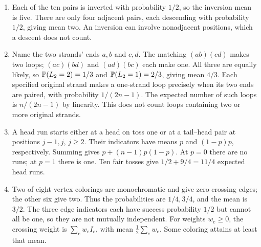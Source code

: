 \begin{enumerate}
 position indicators without requiring them to be independent.
 \item Each of the ten pairs is inverted with probability $1/2$,
 so the inversion mean is five. There are only four adjacent pairs,
 each descending with probability $1/2$, giving mean two. An inversion
 can involve nonadjacent positions, which a descent does not count.
 \item Name the two strands' ends $a,b$ and $c,d$. The matching
 $(ab)(cd)$ makes two loops; $(ac)(bd)$ and $(ad)(bc)$ each make one.
 All three are equally likely, so $\P(L_2=2)=1/3$ and
 $\P(L_2=1)=2/3$, giving mean $4/3$. Each specified original strand
 makes a one-strand loop precisely when its two ends are paired,
 with probability $1/(2n-1)$. The expected number of such loops
 is $n/(2n-1)$ by linearity. This does not count loops containing
 two or more original strands.
 \item A head run starts either at a head on toss one or at a
 tail--head pair at positions $j-1,j$, $j\ge2$. Their indicators have
 means $p$ and $(1-p)p$, respectively. Summing gives
 $p+(n-1)p(1-p)$. At $p=0$ there are no runs; at $p=1$ there is one.
 Ten fair tosses give $1/2+9/4=11/4$ expected head runs.
 \item Two of eight vertex colorings are monochromatic and give
 zero crossing edges; the other six give two. Thus the probabilities
 are $1/4,3/4$, and the mean is $3/2$. The three edge indicators
 each have success probability $1/2$ but cannot all be one, so
 they are not mutually independent. For weights $w_e\ge0$, the
 crossing weight is $\sum_e w_e I_e$, with mean
 $\tfrac12\sum_e w_e$. Some coloring attains at least that mean.
\end{enumerate}

